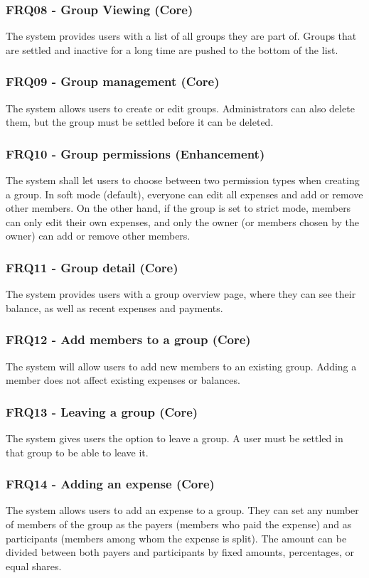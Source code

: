 \documentclass{ctuthesis}
\begin{document}
\subsubsection{FRQ08 - Group Viewing (Core)}
The system provides users with a list of all groups they are part of. Groups that are settled and inactive for a long time are pushed to the bottom of the list.

\subsubsection{FRQ09 - Group management (Core)}
The system allows users to create or edit groups. Administrators can also delete them, but the group must be settled before it can be deleted. 

\subsubsection{FRQ10 - Group permissions (Enhancement)}
The system shall let users to choose between two permission types when creating a group. In soft mode (default), everyone can edit all expenses and add or remove other members. On the other hand, if the group is set to strict mode, members can only edit their own expenses, and only the owner (or members chosen by the owner) can add or remove other members.

\subsubsection{FRQ11 - Group detail (Core)}
The system provides users with a group overview page, where they can see their balance, as well as recent expenses and payments.

\subsubsection{FRQ12 - Add members to a group (Core)}
The system will allow users to add new members to an existing group. Adding a member does not affect existing expenses or balances.

\subsubsection{FRQ13 - Leaving a group (Core)}
The system gives users the option to leave a group. A user must be settled in that group to be able to leave it. 

\subsubsection{\label{frq:14}FRQ14 - Adding an expense (Core)} 
The system allows users to add an expense to a group. They can set any number of members of the group as the payers (members who paid the expense) and as participants (members among whom the expense is split). The amount can be divided between both payers and participants by fixed amounts, percentages, or equal shares.
\end{document}
